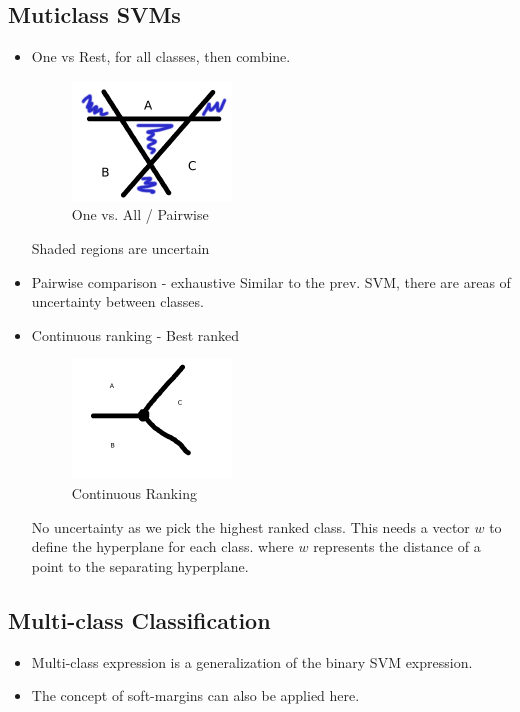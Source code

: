 \documentclass[parskip=half]{scrartcl}
\begin{document}
    \subsection{Muticlass SVMs} %
    \label{sub:muticlass_svms}
    \begin{itemize}
        \item One vs Rest, for all classes, then combine. 
            \begin{figure}[ht]
                \centering
                \includegraphics[width=0.4\textwidth]{one_vs_all_and_pairwise.png}
                \caption{One vs. All / Pairwise}
                \label{fig:one_vs_all_and_pairwise}
            \end{figure}
            Shaded regions are uncertain
        \item Pairwise comparison - exhaustive
            Similar to the prev. SVM, there are areas of uncertainty between classes.
        \item Continuous ranking - Best ranked
            \begin{figure}[ht]
                \centering
                \includegraphics[width=0.4\textwidth]{continuous_rank_svm.png}
                \caption{Continuous Ranking}
                \label{fig:continuous_rank_svm}
            \end{figure}
            No uncertainty as we pick the highest ranked class.
            This needs a vector $w$ to define the hyperplane for each class. where $w$ represents the distance of a point to the separating hyperplane.
    \end{itemize}

    \subsection{Multi-class Classification} %
    \label{sub:multi_class_classification}
    \begin{itemize}
        \item Multi-class expression is a generalization of the binary SVM expression.
        \item The concept of soft-margins can also be applied here.
    \end{itemize}
\end{document}

